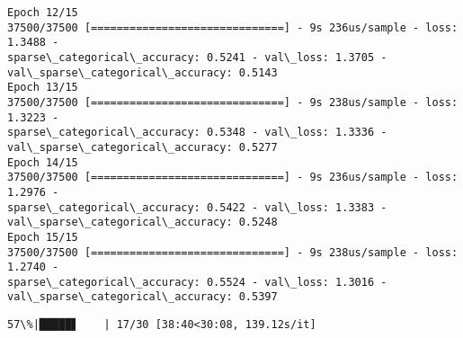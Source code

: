 \documentclass[11pt]{article}
\begin{document}
\begin{Verbatim}[commandchars=\\\{\}]
Epoch 12/15
37500/37500 [==============================] - 9s 236us/sample - loss: 1.3488 -
sparse\_categorical\_accuracy: 0.5241 - val\_loss: 1.3705 -
val\_sparse\_categorical\_accuracy: 0.5143
Epoch 13/15
37500/37500 [==============================] - 9s 238us/sample - loss: 1.3223 -
sparse\_categorical\_accuracy: 0.5348 - val\_loss: 1.3336 -
val\_sparse\_categorical\_accuracy: 0.5277
Epoch 14/15
37500/37500 [==============================] - 9s 236us/sample - loss: 1.2976 -
sparse\_categorical\_accuracy: 0.5422 - val\_loss: 1.3383 -
val\_sparse\_categorical\_accuracy: 0.5248
Epoch 15/15
37500/37500 [==============================] - 9s 238us/sample - loss: 1.2740 -
sparse\_categorical\_accuracy: 0.5524 - val\_loss: 1.3016 -
val\_sparse\_categorical\_accuracy: 0.5397
    \end{Verbatim}

    \begin{Verbatim}[commandchars=\\\{\}]
 57\%|█████▋    | 17/30 [38:40<30:08, 139.12s/it]
    \end{Verbatim}
\end{document}
